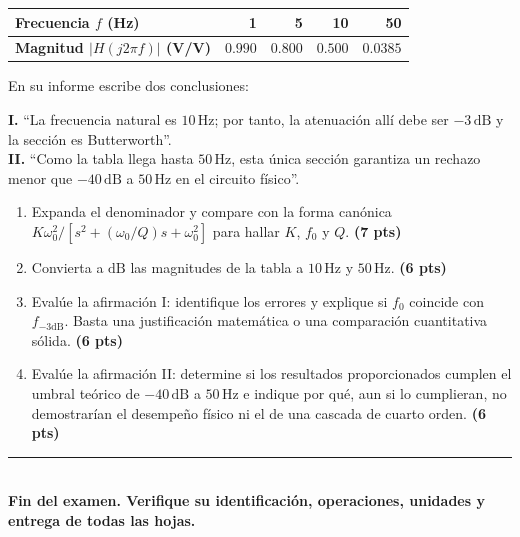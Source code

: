 \documentclass[10pt, a4paper]{article}
\begin{document}
\begin{center}
    \begin{minipage}[c]{0.48\textwidth}
        \centering
    \end{minipage}
    \hfill
    \begin{minipage}[c]{0.48\textwidth}
        \centering
        \footnotesize
        \begin{tabular}{@{}lrrrr@{}}
            \toprule
            \textbf{Frecuencia $f$ (Hz)} & 1 & 5 & 10 & 50 \\
            \midrule
            \textbf{Magnitud $|H(j2\pi f)|$ (V/V)} & $0.990$ & $0.800$ & $0.500$ & $0.0385$ \\
            \bottomrule
        \end{tabular}
    \end{minipage}
\end{center}

En su informe escribe dos conclusiones:
\begin{tcolorbox}[colback=neutralbg, colframe=ucbblue!60, boxrule=0.5pt, arc=1mm, left=6pt, right=6pt, top=4pt, bottom=4pt]
    \footnotesize
    \textbf{I.} ``La frecuencia natural es $10\,\mathrm{Hz}$; por tanto, la atenuación allí debe ser $-3\,\mathrm{dB}$ y la sección es Butterworth''.\\[2pt]
    \textbf{II.} ``Como la tabla llega hasta $50\,\mathrm{Hz}$, esta única sección garantiza un rechazo menor que $-40\,\mathrm{dB}$ a $50\,\mathrm{Hz}$ en el circuito físico''.
\end{tcolorbox}

\begin{enumerate}
    \setlength{\itemsep}{2pt}
    \item Expanda el denominador y compare con la forma canónica $K\omega_0^2 / [s^2 + (\omega_0/Q)s + \omega_0^2]$ para hallar $K$, $f_0$ y $Q$. \hfill \textbf{(7 pts)}
    \item Convierta a $\mathrm{dB}$ las magnitudes de la tabla a \textbf{$10\,\mathrm{Hz}$} y \textbf{$50\,\mathrm{Hz}$}. \hfill \textbf{(6 pts)}
    \item Evalúe la afirmación I: identifique los errores y explique si $f_0$ coincide con $f_{-3\mathrm{dB}}$. Basta una justificación matemática o una comparación cuantitativa sólida. \hfill \textbf{(6 pts)}
    \item Evalúe la afirmación II: determine si los resultados proporcionados cumplen el umbral teórico de $-40\,\mathrm{dB}$ a $50\,\mathrm{Hz}$ e indique por qué, aun si lo cumplieran, no demostrarían el desempeño físico ni el de una cascada de cuarto orden. \hfill \textbf{(6 pts)}
\end{enumerate}

\vspace{0.3cm}
\begin{center}
    \rule{0.72\textwidth}{0.4pt}\\[3pt]
    {\small\textbf{Fin del examen. Verifique su identificación, operaciones, unidades y entrega de todas las hojas.}}
\end{center}
\end{document}
